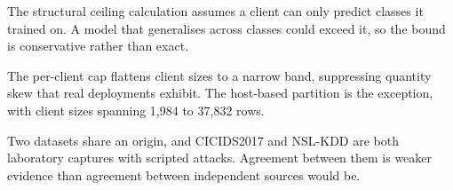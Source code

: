 The structural ceiling calculation assumes a client can only predict classes it
trained on. A model that generalises across classes could exceed it, so the
bound is conservative rather than exact.

The per-client cap flattens client sizes to a narrow band, suppressing quantity
skew that real deployments exhibit. The host-based partition is the exception,
with client sizes spanning 1,984 to 37,832 rows.

Two datasets share an origin, and CICIDS2017 and NSL-KDD are both laboratory
captures with scripted attacks. Agreement between them is weaker evidence than
agreement between independent sources would be.
